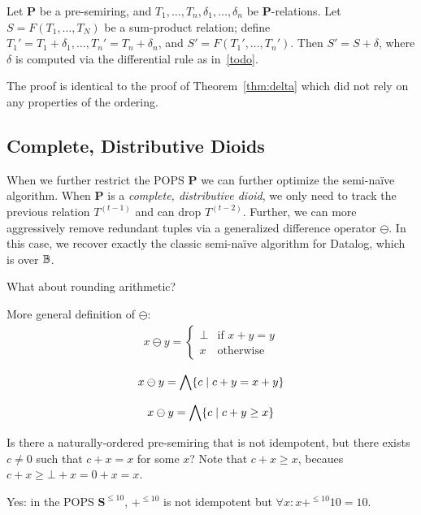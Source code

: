 \begin{thm}
\label{thm:unordered}
Let $\bm P$ be a pre-semiring, and $T_1, \ldots, T_n, \delta_1, \ldots, \delta_n$ be 
 $\bm P$-relations.
Let $S = F(T_1, \ldots, T_N)$ be a sum-product relation;
 define $T_1' = T_1 + \delta_1, \ldots, T_n' = T_n + \delta_n$, 
 and $S' = F(T_1', \ldots, T_n')$.
Then $S' = S + \delta$, where $\delta$ is computed via the differential rule as in~\ref{todo}.
\end{thm}
The proof is identical to the proof of Theorem~\ref{thm:delta} which did not rely on any properties of the ordering.

\subsection{Complete, Distributive Dioids}
When we further restrict the POPS $\bm P$ we can further
 optimize the semi-na\"ive algorithm.
When $\bm P$ is a {\em complete, distributive dioid}, 
 we only need to track the previous relation $T^{(t-1)}$
 and can drop $T^{(t-2)}$.
Further, we can more aggressively remove redundant tuples
 via a generalized difference operator $\ominus$.
In this case, we recover exactly the classic semi-na\"ive algorithm for Datalog, 
 which is \datalogo over $\mathbb B$.

What about rounding arithmetic?

More general definition of $\ominus$:
\begin{align*}
  x \ominus y = \begin{cases}
    \bot & \text{if } x + y = y \\
    x & \text{otherwise}
  \end{cases}
\end{align*}

$$x \ominus y = \bigwedge \{{c}\mid{c + y = x + y}\}$$

$$x \ominus y = \bigwedge \{{c}\mid{c + y \geq x}\}$$

Is there a naturally-ordered pre-semiring that is not idempotent, 
 but there exists $c \neq 0$ such that $c + x = x$ for some $x$?
Note that $c + x \geq x$, becaues $c + x \geq \bot + x = 0 + x = x$.

Yes: in the POPS ${\bm S}^{\leq 10}$, $+^{\leq 10}$ is not idempotent 
 but $\forall x : x +^{\leq 10} 10 = 10$.
